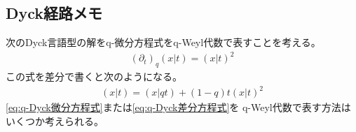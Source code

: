 {\subsection{Dyck経路メモ}\label{s2:Dyck経路メモ} %
	次のDyck言語型の解をq-微分方程式をq-Weyl代数で表すことを考える。
	\begin{equation}\label{eq:q-Dyck微分方程式}\begin{split}
		(\partial_t)_q (x|t) = (x|t)^2
	\end{split}\end{equation}
	この式を差分で書くと次のようになる。
	\begin{equation}\label{eq:q-Dyck差分方程式}\begin{split}
		(x|t) = (x|qt) + (1 - q)t(x|t)^2 
	\end{split}\end{equation}
	\eqref{eq:q-Dyck微分方程式}または\eqref{eq:q-Dyck差分方程式}を
	q-Weyl代数で表す方法はいくつか考えられる。
}
